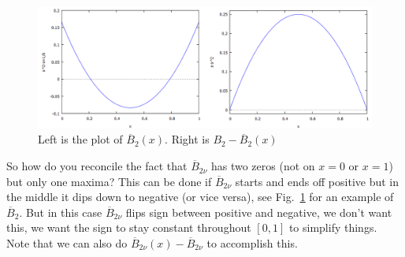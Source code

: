 \documentclass[aps,preprint,preprintnumbers,nofootinbib,showpacs,prd]{revtex4-1}
\begin{document}
%
\begin{figure}
\centering
  \includegraphics[width=1.00\linewidth]{B2.png}
  \caption{Left is the plot of $\overline{B}_2(x)$. Right is $B_2 - \overline{B}_2(x)$}
\label{fig:B2}
\end{figure}
%
So how do you reconcile the fact that $\overline{B}_{2\nu}$ has two zeros (not on $x=0$ or $x=1$) but only one maxima? This can be done if $\overline{B}_{2\nu}$ starts and ends off positive but in the middle it dips down to negative (or vice versa), see Fig.~\ref{fig:B2} for an example of $\overline{B}_2$. But in this case $\overline{B}_{2\nu}$ flips sign between positive and negative, we don't want this, we want the sign to stay constant throughout $[0,1]$ to simplify things. Note that we can also do $\overline{B}_{2\nu}(x) - \overline{B}_{2\nu}$ to accomplish this.
\end{document}
